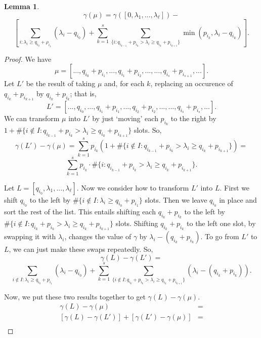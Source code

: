 \documentclass[12pt,psamsfonts]{article}
\newtheorem{lemma}[theorem]{Lemma}
\begin{document}
\begin{lemma}\label{springer_fiber_dim}
    \[\gamma(\mu) = \gamma([0, \lambda_1, ..., \lambda_\ell]) - \] 
    \[\left[\sum_{i : \lambda_i \geq q_{i_0} + \rho_{i_1}} (\lambda_i - q_{i_0}) + \sum_{k = 1}^s \sum_{\{i : q_{i_{k - 1}} + p_{i_k} > \lambda_i \geq q_{i_k} + p_{i_{k + 1}}\}} \min(p_{i_k}, \lambda_i - q_{i_k})\right].\]
\end{lemma}
\begin{proof} We have
    \[\mu = [..., q_{i_0} + p_{i_1}, ..., q_{i_1} + p_{i_2}, ..., ..., q_{i_s} + p_{i_{s + 1}}, ...].\]
    Let \(L'\) be the result of taking \(\mu\) and, for each \(k\), replacing an occurence of \(q_{i_k} + p_{i_{k + 1}}\) by \(q_{i_k} + p_{i_k}\); that is,
    \[L' = [..., q_{i_0}, ..., q_{i_1} + p_{i_1}, ..., q_{i_2} + p_{i_2}, ..., ..., q_{i_s} + p_{i_s}, ...].\]
    We can transform \(\mu\) into \(L'\) by just `moving' each \(p_{i_k}\) to the right by \(1 + \#\{i \notin I : q_{i_{k - 1}} + p_{i_k} > \lambda_i \geq q_{i_k} + p_{i_{k + 1}}\}\) slots.
    So,
    \[\gamma(L') - \gamma(\mu) = \sum_{k = 1}^s p_{i_k} (1 + \#\{i \notin I : q_{i_{k - 1}} + p_{i_k} > \lambda_i \geq q_{i_k} + p_{i_{k + 1}}\}) = \]
    \[\sum_{k = 1}^s p_{i_k} \cdot \#\{i : q_{i_{k - 1}} + p_{i_k} > \lambda_i \geq q_{i_k} + p_{i_{k + 1}}\}.\]
    \par Let \(L = [q_{i_0}, \lambda_1, ..., \lambda_\ell]\).
    Now we consider how to transform \(L'\) into \(L\).
    First we shift \(q_{i_0}\) to the left by \(\#\{i \notin I : \lambda_i \geq q_{i_0} + p_{i_1}\}\) slots.
    Then we leave \(q_{i_0}\) in place and sort the rest of the list.
    This entails shifting each \(q_{i_k} + p_{i_k}\) to the left by \(\#\{i \notin I : q_{i_k} + p_{i_k} > \lambda_i \geq q_{i_k} + p_{i_{k + 1}}\}\) slots.
    Shifting \(q_{i_k} + p_{i_k}\) to the left one slot, by swapping it with \(\lambda_i\), changes the value of \(\gamma\) by \(\lambda_i - (q_{i_k} + p_{i_k})\).
    To go from \(L'\) to \(L\), we can just make these swaps repeatedly.  
    So,
    \[\gamma(L) - \gamma(L') = \]
    \[\sum_{i \notin I : \lambda_i \geq q_{i_0} + p_{i_1}} (\lambda_i - q_{i_0}) + \sum_{k = 1}^s \sum_{\{i \notin I : q_{i_k} + p_{i_k} > \lambda_i \geq q_{i_k} + p_{i_{k + 1}}\}} (\lambda_i - (q_{i_k} + p_{i_k})).\]
    \par Now, we put these two results together to get \(\gamma(L) - \gamma(\mu)\).
    \begin{align*}
        \gamma(L) - \gamma(\mu) & = \\
        [\gamma(L) - \gamma(L')] + [\gamma(L') - \gamma(\mu)] & = \\

\end{align*}
\end{proof}
\end{document}
